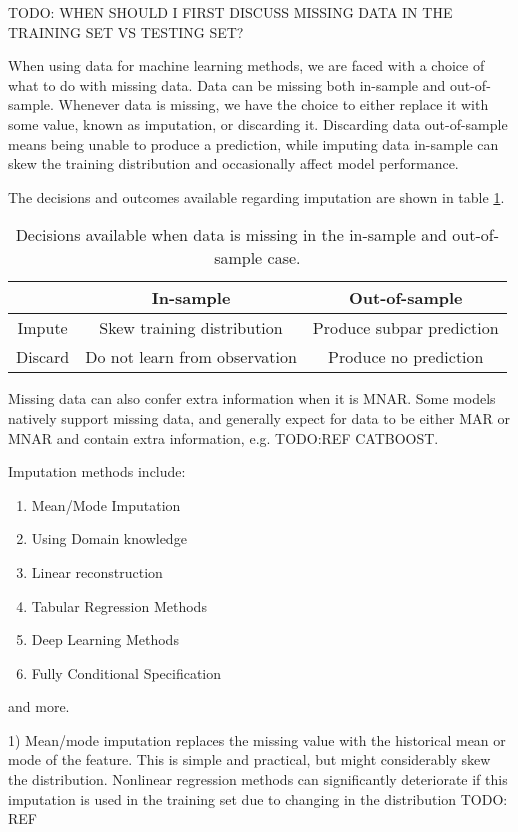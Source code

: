 TODO: WHEN SHOULD I FIRST DISCUSS MISSING DATA IN THE TRAINING SET VS TESTING
SET?

When using data for machine learning methods, we are faced with a choice of
what to do with missing data. Data can be missing both in-sample and
out-of-sample. Whenever data is missing, we have the choice to either replace
it with some value, known as imputation, or discarding it. Discarding data
out-of-sample means being unable to produce a prediction, while imputing data
in-sample can skew the training distribution and occasionally affect model
performance.

The decisions and outcomes available regarding imputation are shown in table
\ref{tab:imputation}.

\begin{table}
  \begin{tabular}{c|cc}
    & In-sample & Out-of-sample \\
    \hline
    Impute & Skew training distribution & Produce subpar prediction \\
    Discard & Do not learn from observation & Produce no prediction
  \end{tabular}
  \caption{Decisions available when data is missing in the in-sample and
  out-of-sample case.}
  \label{tab:imputation}
\end{table}

Missing data can also confer extra information when it is MNAR. Some models
natively support missing data, and generally expect for data to be either MAR
or MNAR and contain extra information, e.g. TODO:REF CATBOOST.


Imputation methods include:
\begin{enumerate}
  \item Mean/Mode Imputation
  \item Using Domain knowledge
  \item Linear reconstruction
  \item Tabular Regression Methods
  \item Deep Learning Methods
  \item Fully Conditional Specification
\end{enumerate}
and more.

1) Mean/mode imputation replaces the missing value with the historical mean or
   mode of the feature. This is simple and practical, but might considerably
   skew the distribution. Nonlinear regression methods can significantly
   deteriorate if this imputation is used in the training set due to changing
   in the distribution TODO: REF

